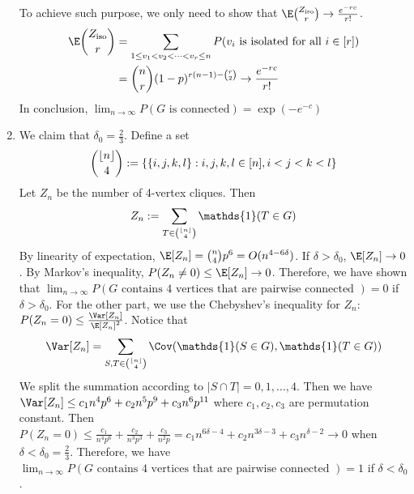 \documentclass{article}
\DeclarePairedDelimiter\floor{\lfloor}{\rfloor}
\def\iso{\mathrm{iso}}
\begin{document}
\begin{enumerate}
To achieve such purpose, we only need to show that
$\E\binom{Z_{\iso}}{r} \to \frac{e^{-rc}}{r!}$.
\begin{align*}
    \E\binom{Z_{\iso}}{r}
    &=\sum_{1 \leq  v_1
    < v_2 < \dots < v_r \leq n}
    P(v_i \textrm{ is isolated for all }i \in [r])
    \\
    &=\binom{n}{r}(1-p)^{r(n-1)-\binom{r}{2}}
    \to \frac{e^{-rc}}{r!}
\end{align*}
In conclusion,
$\lim_{n\to\infty}
P(G \textrm{ is connected})
=\exp(-e^{-c})$
\item We claim that $\delta_0 = \frac{2}{3}$.
Define a set
\begin{align*}
    \binom{\floor{n}}{4}
    :=
    \left\{
    \{i,j,k,l\}:i,j,k,l\in [n],i<j<k<l
    \right\}
\end{align*}
Let $Z_n$
be the number of 4-vertex cliques.
Then
\begin{align*}
    Z_n := \sum_{T \in \binom{\floor{n}}{4}}
    \mathds{1}(T\in G)
\end{align*}
By linearity of expectation, $\E[Z_n]
= \binom{n}{4}p^6 = O(n^{4-6\delta})$.
If $\delta > \delta_0$, $\E[Z_n] \to 0$.
By Markov's inequality, $P(Z_n \neq 0) \leq \E[Z_n]
\to 0$.
Therefore, we have shown that
$\lim_{n\to\infty} P(G
\textrm{ contains 4 vertices that are pairwise connected }) = 0$ if $\delta > \delta_0$.
For the other part, we use the Chebyshev's
inequality for $Z_n$: $P(Z_n = 0)
\leq \frac{\Var[Z_n]}{\E[Z_n]^2}$.
Notice that
\begin{equation*}
    \Var[Z_n]=
    \sum_{S,T\in \binom{\floor{n}}{4}}
    \Cov(\mathds{1}(S \in G), \mathds{1}(T\in G))
\end{equation*}
We split the summation according to $|S\cap T|=0,1,\dots, 4$. Then we have
$\Var[Z_n]\leq c_1 n^4 p^6 + c_2 n^5 p^9 + c_3 n^6 p^{11}$ where $c_1, c_2, c_3$ are permutation constant. Then $P(Z_n = 0)
\leq \frac{c_1}{n^4 p^6} + \frac{c_2}{n^3p^3}
+ \frac{c_3}{n^2p}=c_1 n^{6\delta - 4}
+ c_2 n^{3\delta - 3} + c_3 n^{\delta-2} \to 0$
when $\delta < \delta_0 = \frac{2}{3}$.
Therefore, we have
$\lim_{n\to\infty} P(G
\textrm{ contains 4 vertices that are pairwise connected }) = 1$ if $\delta < \delta_0$.
\end{enumerate}
\end{document}
